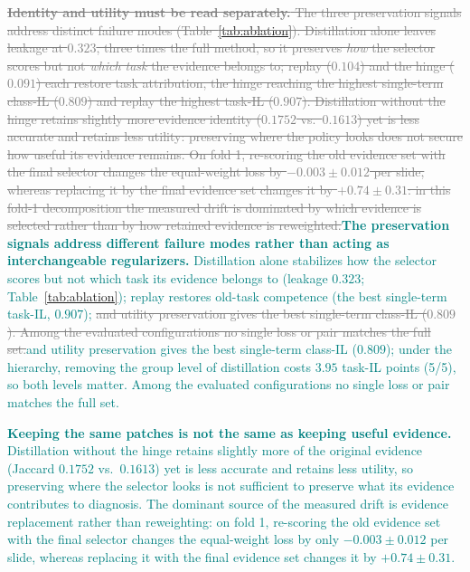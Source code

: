\documentclass{article}
\newif\ifmarkup \markuptrue
\newcommand{\repc}[3]{\ifmarkup\textcolor{gray}{\sout{#2}}\textcolor{#1}{#3}\else#3\fi}
\newcommand{\repG}[2]{\repc{teal}{#1}{#2}}    %
\begin{document}
\repG{\textbf{Identity and utility must be read separately.} The three preservation signals address distinct failure modes (Table~\ref{tab:ablation}). Distillation alone leaves leakage at $0.323$, three times the full method, so it preserves \emph{how} the selector scores but not \emph{which task} the evidence belongs to; replay ($0.104$) and the hinge ($0.091$) each restore task attribution, the hinge reaching the highest single-term class-IL ($0.809$) and replay the highest task-IL ($0.907$). Distillation without the hinge retains slightly more evidence identity ($0.1752$ vs.\ $0.1613$) yet is less accurate and retains less utility: preserving where the policy looks does not secure how useful its evidence remains. On fold 1, re-scoring the old evidence set with the final selector changes the equal-weight loss by $-0.003{\pm}0.012$ per slide, whereas replacing it by the final evidence set changes it by $+0.74{\pm}0.31$: in this fold-1 decomposition the measured drift is dominated by which evidence is selected rather than by how retained evidence is reweighted.}{\textbf{The preservation signals address different failure modes rather than acting as interchangeable regularizers.} Distillation alone stabilizes how the selector scores but not which task its evidence belongs to (leakage $0.323$; Table~\ref{tab:ablation}); replay restores old-task competence (the best single-term task-IL, $0.907$); \repG{and utility preservation gives the best single-term class-IL ($0.809$). Among the evaluated configurations no single loss or pair matches the full set.}{and utility preservation gives the best single-term class-IL ($0.809$); under the hierarchy, removing the group level of distillation costs $3.95$ task-IL points (5/5), so both levels matter. Among the evaluated configurations no single loss or pair matches the full set.}}

\repG{}{\textbf{Keeping the same patches is not the same as keeping useful evidence.} Distillation without the hinge retains slightly more of the original evidence (Jaccard $0.1752$ vs.\ $0.1613$) yet is less accurate and retains less utility, so preserving where the selector looks is not sufficient to preserve what its evidence contributes to diagnosis. The dominant source of the measured drift is evidence replacement rather than reweighting: on fold 1, re-scoring the old evidence set with the final selector changes the equal-weight loss by only $-0.003{\pm}0.012$ per slide, whereas replacing it with the final evidence set changes it by $+0.74{\pm}0.31$.}
\end{document}
